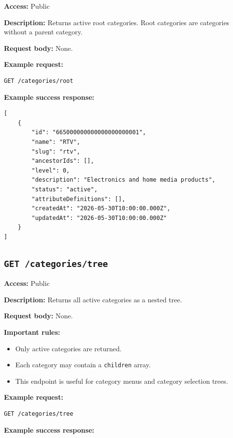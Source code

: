 \textbf{Access:} Public

\textbf{Description:} Returns active root categories. Root categories are categories without a parent category.

\textbf{Request body:} None.

\textbf{Example request:}

\begin{verbatim}
GET /categories/root
\end{verbatim}

\textbf{Example success response:}

\begin{verbatim}
[
    {
        "id": "665000000000000000000001",
        "name": "RTV",
        "slug": "rtv",
        "ancestorIds": [],
        "level": 0,
        "description": "Electronics and home media products",
        "status": "active",
        "attributeDefinitions": [],
        "createdAt": "2026-05-30T10:00:00.000Z",
        "updatedAt": "2026-05-30T10:00:00.000Z"
    }
]
\end{verbatim}

\subsection{\texttt{GET /categories/tree}}

\textbf{Access:} Public

\textbf{Description:} Returns all active categories as a nested tree.

\textbf{Request body:} None.

\textbf{Important rules:}

\begin{itemize}
    \item Only active categories are returned.
    \item Each category may contain a \texttt{children} array.
    \item This endpoint is useful for category menus and category selection trees.
\end{itemize}

\textbf{Example request:}

\begin{verbatim}
GET /categories/tree
\end{verbatim}

\pagebreak
\textbf{Example success response:}

